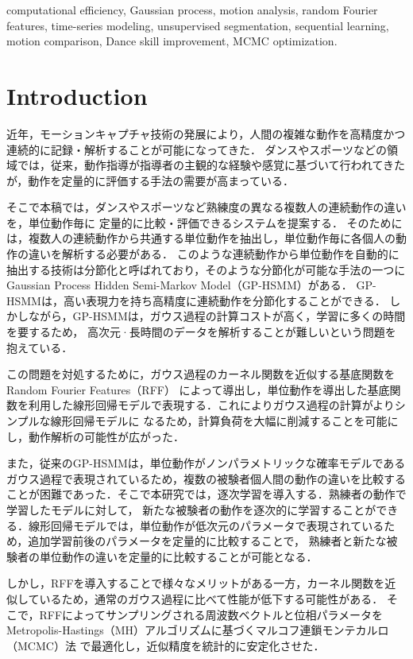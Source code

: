 \documentclass[conference]{IEEEtran}
\begin{document}
\begin{IEEEkeywords}
computational efficiency, Gaussian process, motion analysis, random Fourier features, time-series modeling, unsupervised segmentation, sequential learning, motion comparison, Dance skill improvement, MCMC optimization.
\end{IEEEkeywords}

\section{Introduction}
近年，モーションキャプチャ技術の発展により，人間の複雑な動作を高精度かつ連続的に記録・解析することが可能になってきた\cite{Balazia2018, 3DPW2018, Thoker2021, Lam2023, Suo2024, DanceMVP2024}．
ダンスやスポーツなどの領域では，従来，動作指導が指導者の主観的な経験や感覚に基づいて行われてきたが，動作を定量的に評価する手法の需要が高まっている．

そこで本稿では，ダンスやスポーツなど熟練度の異なる複数人の連続動作の違いを，単位動作毎に
定量的に比較・評価できるシステムを提案する．
そのためには，複数人の連続動作から共通する単位動作を抽出し，単位動作毎に各個人の動作の違いを解析する必要がある．
このような連続動作から単位動作を自動的に抽出する技術は分節化と呼ばれており，そのような分節化が可能な手法の一つに
Gaussian Process Hidden Semi-Markov Model（GP-HSMM）\cite{Nakamura2017}がある．
GP-HSMMは，高い表現力を持ち高精度に連続動作を分節化することができる．
しかしながら，GP-HSMMは，ガウス過程の計算コストが高く，学習に多くの時間を要するため，
高次元·長時間のデータを解析することが難しいという問題を抱えている．

この問題を対処するために，ガウス過程のカーネル関数を近似する基底関数をRandom Fourier Features（RFF）\cite{Rahimi2007} 
によって導出し，単位動作を導出した基底関数を利用した線形回帰モデルで表現する．これによりガウス過程の計算がよりシンプルな線形回帰モデルに
なるため，計算負荷を大幅に削減することを可能にし，動作解析の可能性が広がった．

また，従来のGP-HSMMは，単位動作がノンパラメトリックな確率モデルであるガウス過程で表現されているため，複数の被験者個人間の動作の違いを比較することが困難であった．そこで本研究では，逐次学習\cite{Broderick2013}を導入する．熟練者の動作で学習したモデルに対して，
新たな被験者の動作を逐次的に学習することができる．線形回帰モデルでは，単位動作が低次元のパラメータで表現されているため，追加学習前後のパラメータを定量的に比較することで，
熟練者と新たな被験者の単位動作の違いを定量的に比較することが可能となる．

しかし，RFFを導入することで様々なメリットがある一方，カーネル関数を近似しているため，通常のガウス過程に比べて性能が低下する可能性がある．
そこで，RFFによってサンプリングされる周波数ベクトルと位相パラメータを Metropolis-Hastings（MH）アルゴリズムに基づくマルコフ連鎖モンテカルロ（MCMC）法\cite{Hastings1970} で最適化し，近似精度を統計的に安定化させた．
\end{document}
